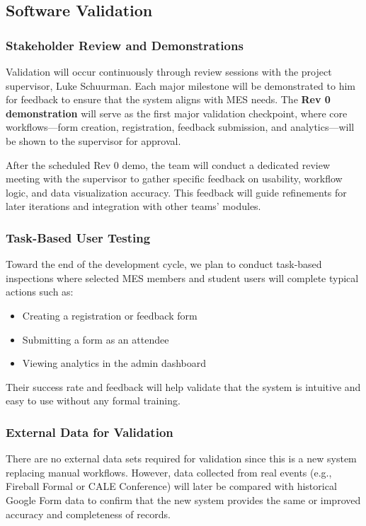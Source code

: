 \documentclass[12pt, titlepage]{article}
\begin{document}
\subsection{Software Validation}

\subsubsection*{Stakeholder Review and Demonstrations}
Validation will occur continuously through review sessions with the project supervisor, Luke Schuurman. Each major milestone will be demonstrated to him for feedback to ensure that the system aligns with MES needs. The \textbf{Rev 0 demonstration} will serve as the first major validation checkpoint, where core workflows—form creation, registration, feedback submission, and analytics—will be shown to the supervisor for approval.

After the scheduled Rev 0 demo, the team will conduct a dedicated review meeting with the supervisor to gather specific feedback on usability, workflow logic, and data visualization accuracy. This feedback will guide refinements for later iterations and integration with other teams’ modules.

\subsubsection*{Task-Based User Testing}
Toward the end of the development cycle, we plan to conduct task-based inspections where selected MES members and student users will complete typical actions such as:
\begin{itemize}
  \item Creating a registration or feedback form
  \item Submitting a form as an attendee
  \item Viewing analytics in the admin dashboard
\end{itemize}
Their success rate and feedback will help validate that the system is intuitive and easy to use without any formal training.

\subsubsection*{External Data for Validation}
There are no external data sets required for validation since this is a new system replacing manual workflows. However, data collected from real events (e.g., Fireball Formal or CALE Conference) will later be compared with historical Google Form data to confirm that the new system provides the same or improved accuracy and completeness of records.
\end{document}
